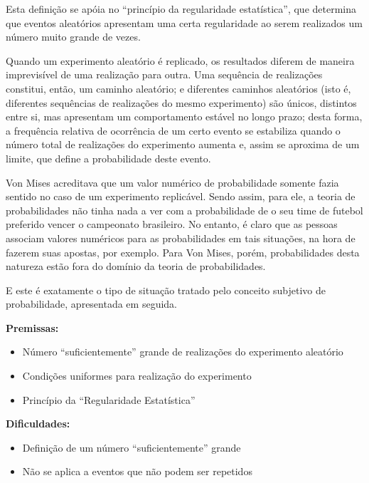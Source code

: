 \documentclass[
]{book}
\providecommand{\tightlist}{%
  \setlength{\itemsep}{0pt}\setlength{\parskip}{0pt}}
\theoremstyle{definition}
\theoremstyle{definition}
\theoremstyle{definition}
\theoremstyle{remark}
\begin{document}
Esta definição se apóia no ``princípio da regularidade estatística'', que determina que eventos aleatórios apresentam uma certa regularidade ao serem realizados um número muito grande de vezes.

Quando um experimento aleatório é replicado, os resultados diferem de maneira imprevisível de uma realização para outra. Uma sequência de realizações constitui, então, um caminho aleatório; e diferentes caminhos aleatórios (isto é, diferentes sequências de realizações do mesmo experimento) são únicos, distintos entre si, mas apresentam um comportamento estável no longo prazo; desta forma, a frequência relativa de ocorrência de um certo evento se estabiliza quando o número total de realizações do experimento aumenta e, assim se aproxima de um limite, que define a probabilidade deste evento.

Von Mises acreditava que um valor numérico de probabilidade somente fazia sentido no caso de um experimento replicável. Sendo assim, para ele, a teoria de probabilidades não tinha nada a ver com a probabilidade de o seu time de futebol preferido vencer o campeonato brasileiro. No entanto, é claro que as pessoas associam valores numéricos para as probabilidades em tais situações, na hora de fazerem suas apostas, por exemplo. Para Von Mises, porém, probabilidades desta natureza estão fora do domínio da teoria de probabilidades.

E este é exatamente o tipo de situação tratado pelo conceito subjetivo de probabilidade, apresentada em seguida.

\textbf{Premissas:}

\begin{itemize}
\tightlist
\item
  Número ``suficientemente'' grande de realizações do experimento aleatório\\
\item
  Condições uniformes para realização do experimento\\
\item
  Princípio da ``Regularidade Estatística''
\end{itemize}

\textbf{Dificuldades:}

\begin{itemize}
\tightlist
\item
  Definição de um número ``suficientemente'' grande\\
\item
  Não se aplica a eventos que não podem ser repetidos
\end{itemize}
\end{document}
